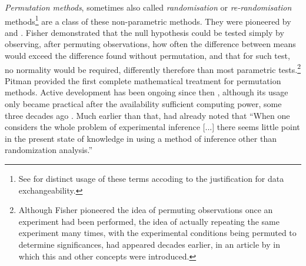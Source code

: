 \emph{Permutation methods}, sometimes also called \emph{randomisation} or \emph{re-randomisation} methods\footnote{See \citet{Nichols2002} for distinct usage of these terms accoding to the justification for data exchangeability.} are a class of these non-parametric methods. They were pioneered by \citet{Fisher1935} and \citet{Pitman1937-I, Pitman1937-II, Pitman1938}. Fisher demonstrated that the null hypothesis could be tested simply by observing, after permuting observations, how often the difference between means would exceed the difference found without permutation, and that for such test, no normality would be required, differently therefore than most parametric tests.\footnote{Although Fisher pioneered the idea of permuting observations once an experiment had been performed, the idea of actually repeating the same experiment many times, with the experimental conditions being permuted to determine significances, had appeared decades earlier, in an article by \citet{Peirce1884} in which this and other concepts were introduced.} Pitman provided the first complete mathematical treatment for permutation methods. Active development has been ongoing since then \citep{Pearson1937, Scheffe1943, Lehmann1949, Kempthorne1955, Edgington1995, Pesarin2001, Good2002, Good2005, Westfall2008, Pesarin2010}, although its usage only became practical after the availability sufficient computing power, some three decades ago \citep{Efron1979}. Much earlier than that, \citet{Kempthorne1955} had already noted that ``When one considers the whole problem of experimental inference [...] there seems little point in the present state of knowledge in using a method of inference other than randomization analysis.''


